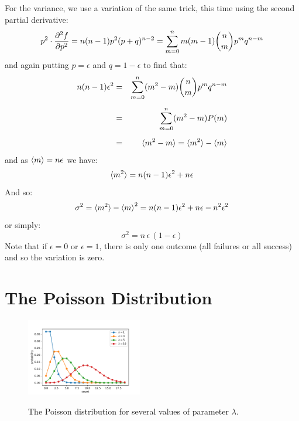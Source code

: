 \documentclass[12pt,oneside]{book}
\begin{document}
For the variance, we use a variation of the same trick, this time using the second partial derivative:
\begin{displaymath}
p^2 \cdot \frac{\partial^2 f}{\partial p^2} = n(n-1)p^2(p+q)^{n-2} = \sum_{m=0}^n m (m-1) \binom{n}{m} p^{m} q^{n-m} \\
\end{displaymath}
and again putting $p=\epsilon$ and $q=1-\epsilon$ to find that:
\begin{eqnarray*}
n(n-1)\epsilon^2 &=& \sum_{m=0}^n (m^2 -m) \binom{n}{m} p^{m} q^{n-m} \\[5pt]
&=& \sum_{m=0}^n (m^2 -m) P(m) \\[5pt]
&=& \braket{m^2-m} = \braket{m^2}-\braket{m}
\end{eqnarray*}
and as $\braket{m} = n \epsilon$ we have:
\begin{displaymath}
\braket{m^2} = n(n-1)\epsilon^2 + n \epsilon
\end{displaymath}
And so:
\begin{displaymath}
\sigma^2 = \braket{m^2} - \braket{m}^2 = n(n-1)\epsilon^2 + n \epsilon - n^2\epsilon^2
\end{displaymath}
or simply:
\begin{equation}
\sigma^2 = n \, \epsilon \, (1 - \epsilon)
\end{equation}
Note that if $\epsilon=0$ or $\epsilon=1$, there is only one outcome (all failures or all success) and so the variation is zero.

\section{The Poisson Distribution}
\label{sec:poisson}

\begin{figure}[htbp]
\begin{center}
{\includegraphics[width=0.45\textwidth]{figs/poisson.pdf}}
\end{center}
\caption{\label{fig:poisson}  The Poisson distribution for several values of parameter $\lambda$.}
\end{figure}
\end{document}
